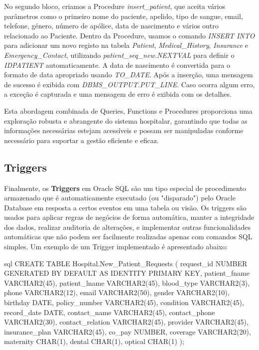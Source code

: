 No segundo bloco, criamos a Procedure \textit{insert\_patient}, que aceita vários parâmetros como o primeiro nome do paciente, apelido, tipo de sangue, email, telefone, género, número de apólice, data de nascimento e vários outro relacionado ao Paciente. Dentro da Procedure, usamos o comando \textit{INSERT INTO} para adicionar um novo registo na tabela \textit{Patient}, \textit{Medical\_History}, \textit{Insurance} e  \textit{Emergency\_Contact}, utilizando \textit{patient\_seq\_new.NEXTVAL} para definir o \textit{IDPATIENT} automaticamente. A data de nascimento é convertida para o formato de data apropriado usando \textit{TO\_DATE}. Após a inserção, uma mensagem de sucesso é exibida com \textit{DBMS\_OUTPUT.PUT\_LINE}. Caso ocorra algum erro, a exceção é capturada e uma mensagem de erro é exibida com os detalhes.

Esta abordagem combinada de Queries, Functions e Procedures proporciona uma exploração robusta e abrangente do sistema hospitalar, garantindo que todas as informações necessárias estejam acessíveis e possam ser manipuladas conforme necessário para suportar a gestão eficiente e eficaz.

\subsection{Triggers}

Finalmente, os \textbf{Triggers} em Oracle SQL são um tipo especial de procedimento armazenado que é automaticamente executado (ou "disparado") pelo Oracle Database em resposta a certos eventos em uma tabela ou visão. Os triggers são usados para aplicar regras de negócios de forma automática, manter a integridade dos dados, realizar auditoria de alterações, e implementar outras funcionalidades automáticas que não podem ser facilmente realizadas apenas com comandos SQL simples. Um exemplo de um Trigger implementado é apresentado abaixo:

\begin{myminted}{sql}
CREATE TABLE Hospital.New_Patient_Requests (
    request_id NUMBER GENERATED BY DEFAULT AS IDENTITY PRIMARY KEY,
    patient_fname VARCHAR2(45),
    patient_lname VARCHAR2(45),
    blood_type    VARCHAR2(3),
    phone         VARCHAR2(12),
    email         VARCHAR2(50),
    gender        VARCHAR2(10),
    birthday      DATE,
    policy_number VARCHAR2(45),
    condition     VARCHAR2(45),
    record_date   DATE,
    contact_name  VARCHAR2(45),
    contact_phone VARCHAR2(30),
    contact_relation VARCHAR2(45),
    provider      VARCHAR2(45),
    insurance_plan VARCHAR2(45),
    co_pay        NUMBER,
    coverage      VARCHAR2(20),
    maternity     CHAR(1),
    dental        CHAR(1),
    optical       CHAR(1)
);
\end{myminted}

